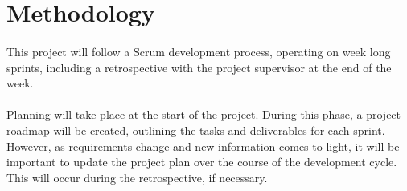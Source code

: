 	
\section{Methodology}
	\paragraph{}{
	This project will follow a Scrum development process, operating on week long sprints, including a retrospective with the project supervisor at the end of the week.
	}
	\paragraph{}{
	Planning will take place at the start of the project. During this phase, a project roadmap will be created, outlining the tasks and deliverables for each sprint. However, as requirements change and new information comes to light, it will be important to update the project plan over the course of the development cycle. This will occur during the retrospective, if necessary.
	}
